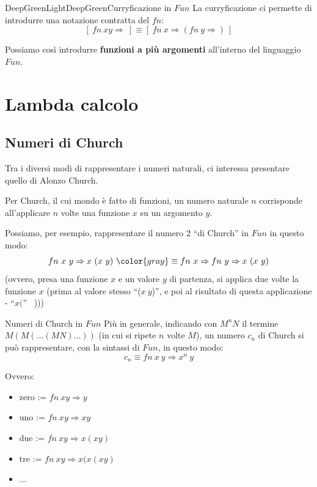 \documentclass[a4paper,11pt]{report}
\begin{document}
\begin{cframe}{DeepGreenLight}{DeepGreen}{Curryficazione in \( Fun \)}
    La curryficazione ci permette di introdurre una notazione contratta del \( fn \):
    \[ [ \ fn \ x y \Rightarrow \ ] \equiv [ \ fn \ x \Rightarrow ( fn \ y \Rightarrow ) \ ]\]

    Possiamo così introdurre \textbf{funzioni a più argomenti} all'interno del linguaggio \( Fun \).

\end{cframe}

\chapter{Lambda calcolo}
\section{Numeri di Church}
Tra i diversi modi di rappresentare i numeri naturali, ci interessa presentare quello di Alonzo Church.

Per Church, il cui mondo è fatto di funzioni, un numero naturale \( n \) corrisponde all'applicare \( n \) volte una funzione \( x \) su un argomento \( y \).
 
Possiamo, per esempio, rappresentare il numero \( 2 \) ``di Church'' in \( Fun \) in questo modo:
\[ fn \  x \ y \Rightarrow x \ (x \ y) \ {\color{gray} \equiv fn \ x \Rightarrow fn \ y \Rightarrow x \ (x \ y) }\]
    (ovvero, presa una funzione \( x \) e un valore \( y \) di partenza, si applica due volte la funzione \( x \) (prima al valore stesso ``(\( x \ y \))'', e poi al risultato di questa applicazione - ``\( x( \)'' \ )))


\begin{defframe}{Numeri di Church in \( Fun \)}{}
    Più in generale, indicando con \( M^n N \) il termine \( M(M(\dots(MN)\dots)) \) {\small\color{gray}(in cui si ripete \( n \) volte \( M \))}, un numero \(c_n\) di Church si può rappresentare, con la sintassi di \( Fun \), in questo modo:
    \[ c_n \equiv fn \ x \ y \Rightarrow x^n \ y \]

    Ovvero:
    \begin{itemize}
        \item zero := \( fn \ xy \Rightarrow y \)
        \item uno := \( fn \ xy \Rightarrow xy \)
        \item due := \( fn \ xy \Rightarrow x(xy) \)
        \item tre := \( fn \ xy \Rightarrow x(x(xy) \)
        \item \( \dots \)
    \end{itemize}
\end{defframe}
\end{document}
